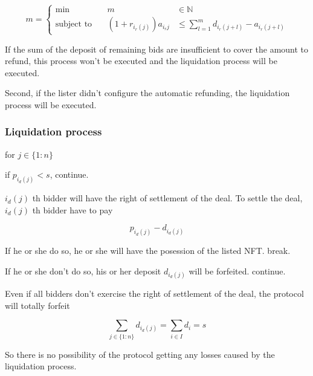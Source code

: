 \documentclass[dvipdfmx]{jsarticle}
\begin{document}
$$
  m = \left\{\begin{aligned}
    \min && \ m & \in \mathbb{N} \\
    \text{subject to} && \ (1 + r_{i_r(j)}) a_{i_r{j}} & \le \sum_{l=1}^m {d_{i_r(j+l)} - a_{i_r(j+l)}}
  \end{aligned}\right.
$$

If the sum of the deposit of remaining bids are insufficient to cover the amount to refund, this process won't be executed and the liquidation process will be executed.

Second, if the lister didn't configure the automatic refunding, the liquidation process will be executed.

\subsubsection{Liquidation process}

for $j \in \{1:n\}$

if $p_{i_d(j)} < s$, continue.

$i_d(j)$ th bidder will have the right of settlement of the deal.
To settle the deal, $i_d(j)$ th bidder have to pay

$$
  p_{i_d(j)} - d_{i_d(j)}
$$

If he or she do so, he or she will have the posession of the listed NFT. break.

If he or she don't do so, his or her deposit $d_{i_d(j)}$ will be forfeited. continue.

Even if all bidders don't exercise the right of settlement of the deal,
the protocol will totally forfeit 

$$
  \sum_{j \in \{1:n\}} d_{i_d(j)} = \sum_{i \in I} d_i = s
$$

So there is no possibility of the protocol getting any losses caused by the liquidation process.
\end{document}
